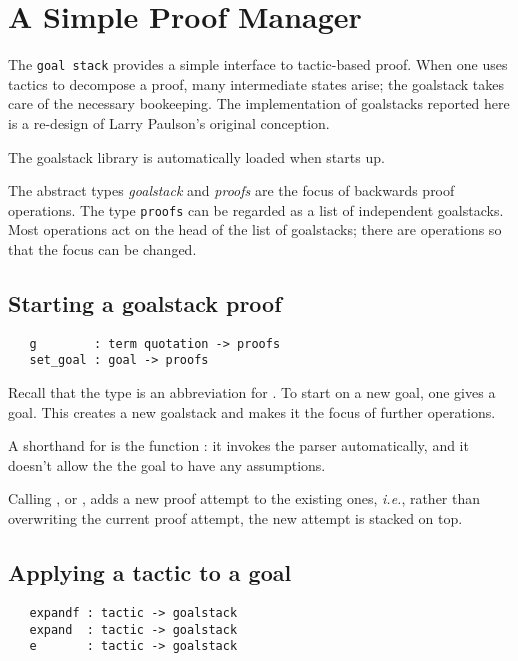 \section{A Simple Proof Manager}\label{sec:goalstack}

The \texttt{goal stack} provides a simple interface to tactic-based
proof. When one uses tactics to decompose a proof, many intermediate
states arise; the goalstack takes care of the necessary bookeeping. The
implementation of goalstacks reported here is a re-design of Larry
Paulson's original conception.

The goalstack library is automatically loaded when \HOL{} starts up.

The abstract types \textit{goalstack} and \textit{proofs} are the
focus of backwards proof operations. The type \verb+proofs+ can be
regarded as a list of independent goalstacks. Most operations act on
the head of the list of goalstacks; there are operations so that the
focus can be changed.

\subsection{Starting a goalstack proof}

\begin{verbatim}
   g        : term quotation -> proofs
   set_goal : goal -> proofs
\end{verbatim}

Recall that the type  is an abbreviation for
. To start on a new goal, one gives
 a goal. This creates a new goalstack and makes it the
focus of further operations.

A shorthand for  is the function : it
invokes the parser automatically, and it doesn't allow the the goal to
have any assumptions.

Calling , or , adds a new proof attempt to the
existing ones, \textit{i.e.}, rather than overwriting the current
proof attempt, the new attempt is stacked on top.

\subsection{Applying a tactic to a goal}

\begin{verbatim}
   expandf : tactic -> goalstack
   expand  : tactic -> goalstack
   e       : tactic -> goalstack
\end{verbatim}

